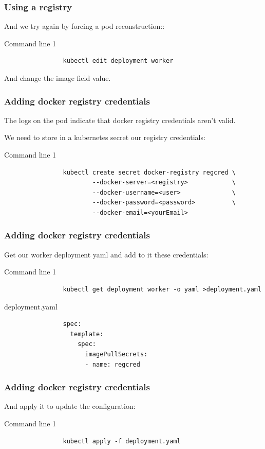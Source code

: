	\begin{frame}[fragile]
		\frametitle{Using a registry}
	
		And we try again by forcing a pod reconstruction::
		\begin{block}{Command line 1}
			\begin{verbatim}
				kubectl edit deployment worker
			\end{verbatim}
			\medskip
			And change the image field value.
		\end{block}
	
	\end{frame}

	\begin{frame}[fragile]
		\frametitle{Adding docker registry credentials}
		
		The logs on the pod indicate that docker registry credentials aren't valid.
		
		We need to store in a kubernetes secret our registry credentials:
		\begin{block}{Command line 1}
			\begin{verbatim}
				kubectl create secret docker-registry regcred \
				        --docker-server=<registry>            \
				        --docker-username=<user>              \
				        --docker-password=<password>          \
				        --docker-email=<yourEmail>
			\end{verbatim}
		\end{block}
	\end{frame}
	
	\begin{frame}[fragile]
		\frametitle{Adding docker registry credentials}
		
		Get our worker deployment yaml and add to it these credentials:
		\begin{block}{Command line 1}
			\begin{verbatim}
				kubectl get deployment worker -o yaml >deployment.yaml
			\end{verbatim}
		\end{block}
		\begin{block}{deployment.yaml}
			\begin{verbatim}
				spec:
				  template:
				    spec:
				      imagePullSecrets:
				      - name: regcred
			\end{verbatim}
		\end{block}
	\end{frame}
	
	\begin{frame}[fragile]
		\frametitle{Adding docker registry credentials}
		And apply it to update the configuration:
		\begin{block}{Command line 1}
			\begin{verbatim}
				kubectl apply -f deployment.yaml
			\end{verbatim}
		\end{block}
	\end{frame}
